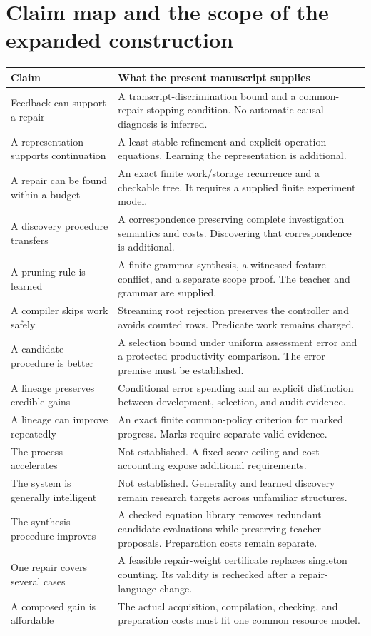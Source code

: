 \documentclass[11pt,letterpaper]{article}
\theoremstyle{plain}
\theoremstyle{definition}
\begin{document}
\section{Claim map and the scope of the expanded construction}\label{app:claimmap}
\begin{small}\begin{longtable}{@{}p{}p{}@{}}\toprule
Claim & What the present manuscript supplies\\\midrule\endhead
Feedback can support a repair & A transcript-discrimination bound and a common-repair stopping condition. No automatic causal diagnosis is inferred.\\
A representation supports continuation & A least stable refinement and explicit operation equations. Learning the representation is additional.\\
A repair can be found within a budget & An exact finite work/storage recurrence and a checkable tree. It requires a supplied finite experiment model.\\
A discovery procedure transfers & A correspondence preserving complete investigation semantics and costs. Discovering that correspondence is additional.\\
A pruning rule is learned & A finite grammar synthesis, a witnessed feature conflict, and a separate scope proof. The teacher and grammar are supplied.\\
A compiler skips work safely & Streaming root rejection preserves the controller and avoids counted rows. Predicate work remains charged.\\
A candidate procedure is better & A selection bound under uniform assessment error and a protected productivity comparison. The error premise must be established.\\
A lineage preserves credible gains & Conditional error spending and an explicit distinction between development, selection, and audit evidence.\\
A lineage can improve repeatedly & An exact finite common-policy criterion for marked progress. Marks require separate valid evidence.\\
The process accelerates & Not established. A fixed-score ceiling and cost accounting expose additional requirements.\\
The system is generally intelligent & Not established. Generality and learned discovery remain research targets across unfamiliar structures.\\The synthesis procedure improves & A checked equation library removes redundant candidate evaluations while preserving teacher proposals. Preparation costs remain separate.\\
One repair covers several cases & A feasible repair-weight certificate replaces singleton counting. Its validity is rechecked after a repair-language change.\\
A composed gain is affordable & The actual acquisition, compilation, checking, and preparation costs must fit one common resource model.\\
\bottomrule
\end{longtable}\end{small}
\end{document}
